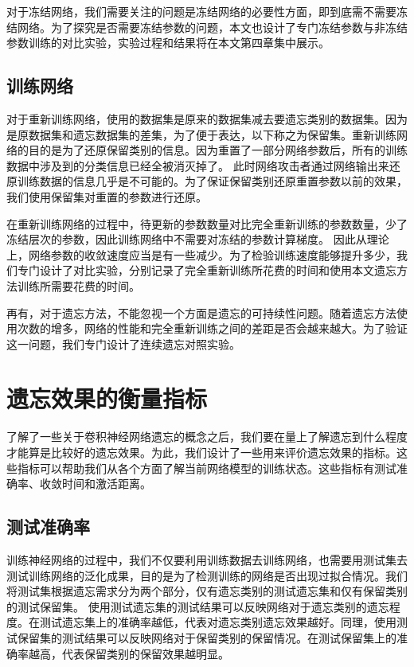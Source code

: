 对于冻结网络，我们需要关注的问题是冻结网络的必要性方面，即到底需不需要冻结网络。为了探究是否需要冻结参数的问题，本文也设计了专门冻结参数与非冻结参数训练的对比实验，实验过程和结果将在本文第四章集中展示。

\subsection{训练网络}

对于重新训练网络，使用的数据集是原来的数据集减去要遗忘类别的数据集。因为是原数据集和遗忘数据集的差集，为了便于表达，以下称之为保留集。重新训练网络的目的是为了还原保留类别的信息。因为重置了一部分网络参数后，所有的训练数据中涉及到的分类信息已经全被消灭掉了。
此时网络攻击者通过网络输出来还原训练数据的信息几乎是不可能的。为了保证保留类别还原重置参数以前的效果，我们使用保留集对重置的参数进行还原。

在重新训练网络的过程中，待更新的参数数量对比完全重新训练的参数数量，少了冻结层次的参数，因此训练网络中不需要对冻结的参数计算梯度。
因此从理论上，网络参数的收敛速度应当是有一些减少。为了检验训练速度能够提升多少，我们专门设计了对比实验，分别记录了完全重新训练所花费的时间和使用本文遗忘方法训练所需要花费的时间。

再有，对于遗忘方法，不能忽视一个方面是遗忘的可持续性问题。随着遗忘方法使用次数的增多，网络的性能和完全重新训练之间的差距是否会越来越大。为了验证这一问题，我们专门设计了连续遗忘对照实验。

\section{遗忘效果的衡量指标} \label{forget_evaluation_index}

了解了一些关于卷积神经网络遗忘的概念之后，我们要在量上了解遗忘到什么程度才能算是比较好的遗忘效果。为此，我们设计了一些用来评价遗忘效果的指标。这些指标可以帮助我们从各个方面了解当前网络模型的训练状态。这些指标有测试准确率、收敛时间和激活距离。
\subsection{测试准确率}

训练神经网络的过程中，我们不仅要利用训练数据去训练网络，也需要用测试集去测试训练网络的泛化成果，目的是为了检测训练的网络是否出现过拟合情况。我们将测试集根据遗忘需求分为两个部分，仅有遗忘类别的测试遗忘集和仅有保留类别的测试保留集。
使用测试遗忘集的测试结果可以反映网络对于遗忘类别的遗忘程度。在测试遗忘集上的准确率越低，代表对遗忘类别遗忘效果越好。同理，使用测试保留集的测试结果可以反映网络对于保留类别的保留情况。在测试保留集上的准确率越高，代表保留类别的保留效果越明显。

